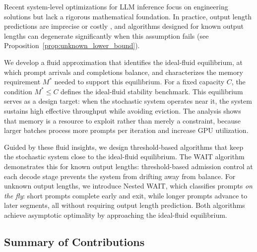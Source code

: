 Recent system-level optimizations for LLM inference \citep{yu2022orca, kwon2023efficient, agrawal2023sarathi, pope2023efficiently, deepseekai2024deepseekv2strongeconomicalefficient, patel2024splitwise, zhong2024distserve} focus on engineering solutions but lack a rigorous mathematical foundation. In practice, output length predictions are imprecise or costly \citep{fu2025efficient}, and algorithms designed for known output lengths can degenerate significantly when this assumption fails (see Proposition~\ref{prop:unknown_lower_bound}).

We develop a fluid approximation that identifies the ideal-fluid equilibrium, at which prompt arrivals and completions balance, and characterizes the memory requirement \(M^*\) needed to support this equilibrium. For a fixed capacity \(C\), the condition \(M^*\le C\) defines the ideal-fluid stability benchmark. This equilibrium serves as a design target: when the stochastic system operates near it, the system sustains high effective throughput while avoiding eviction. The analysis shows that memory is a resource to exploit rather than merely a constraint, because larger batches process more prompts per iteration and increase GPU utilization.

Guided by these fluid insights, we design threshold-based algorithms that keep the stochastic system close to the ideal-fluid equilibrium. The WAIT algorithm demonstrates this for known output lengths: threshold-based admission control at each decode stage prevents the system from drifting away from balance. For unknown output lengths, we introduce Nested WAIT, which classifies prompts \emph{on the fly}: short prompts complete early and exit, while longer prompts advance to later segments, all without requiring output length prediction. Both algorithms achieve asymptotic optimality by approaching the ideal-fluid equilibrium.

\subsection{Summary of Contributions}

